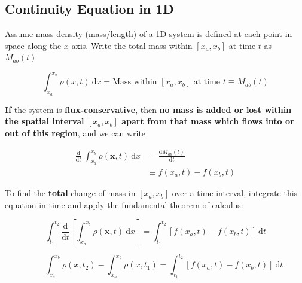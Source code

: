 \documentclass[notoc]{tufte-handout}
\renewcommand{\vec}[1]{
\mathbf{#1}
}
\begin{document}
 
\subsection{Continuity Equation in 1D}

Assume mass density (mass/length) of a 1D system is  defined at each point in space along the $x$ axis. Write the total mass within $[x_a,x_b]$  at time $t$ as $M_{ab}(t)$

     \begin{equation}
        \int_{x_a}^{x_b} \rho ({x},t)~\mathrm{d}x = \text{Mass within }[x_a,x_b] \text{ at time }t \equiv M_{ab}(t)
    \end{equation}
%

{\bf If} the system is {\bf flux-conservative}, then {\bf no mass is added or lost within the spatial interval $[x_a,x_b]$ apart from that mass which flows into or out of this region}, and we can write

\begin{align}
\frac{\mathrm{d}}{\mathrm{d}t }~\int_{x_a}^{x_b} \rho (\vec{x},t)~\mathrm{d}x & = \frac{\mathrm{d}M_{ab}(t)}{\mathrm{d}t } \\
& \equiv f(x_a,t) - f(x_b,t)
\end{align}

To find the {\bf total} change of mass in $[x_a,x_b]$ over a time interval, integrate this equation in time and apply the fundamental theorem of calculus:

\begin{equation}
\int_{t_1}^{t_2} \frac{\mathrm{d}}{\mathrm{d}t } \left[ \int_{x_a}^{x_b} \rho (\vec{x},t)~\mathrm{d}x \right]  = \int_{t_1}^{t_2} \left[ f(x_a,t) - f(x_b,t) \right]~\mathrm{d}t 
\end {equation}

\begin {equation}
\qquad \int_{x_a}^{x_b} \rho (x,t_2) - \int_{x_a}^{x_b} \rho (x,t_1)  =  \int_{t_1}^{t_2} \left[ f(x_a,t) - f(x_b,t) \right]~\mathrm{d}t 
\end {equation}
\end{document}

